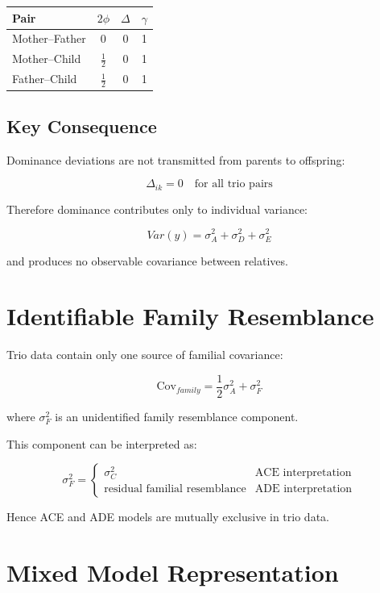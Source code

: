\documentclass[12pt]{article}
\begin{document}
\begin{center}
\begin{tabular}{lccc}
\toprule
Pair & $2\phi$ & $\Delta$ & $\gamma$ \\
\midrule
Mother--Father & 0 & 0 & 1 \\
Mother--Child  & $\tfrac12$ & 0 & 1 \\
Father--Child  & $\tfrac12$ & 0 & 1 \\
\bottomrule
\end{tabular}
\end{center}

\subsection{Key Consequence}

Dominance deviations are not transmitted from parents to offspring:

\[
\Delta_{ik}=0 \quad \text{for all trio pairs}
\]

Therefore dominance contributes only to individual variance:

\[
Var(y)=\sigma_A^2+\sigma_D^2+\sigma_E^2
\]

and produces no observable covariance between relatives.

\section{Identifiable Family Resemblance}

Trio data contain only one source of familial covariance:

\[
\text{Cov}_{family} =
\frac12\sigma_A^2 + \sigma_F^2
\]

where $\sigma_F^2$ is an unidentified family resemblance component.

This component can be interpreted as:

\[
\sigma_F^2 =
\begin{cases}
\sigma_C^2 & \text{ACE interpretation} \\
\text{residual familial resemblance} & \text{ADE interpretation}
\end{cases}
\]

Hence ACE and ADE models are mutually exclusive in trio data.

\section{Mixed Model Representation}
\end{document}
